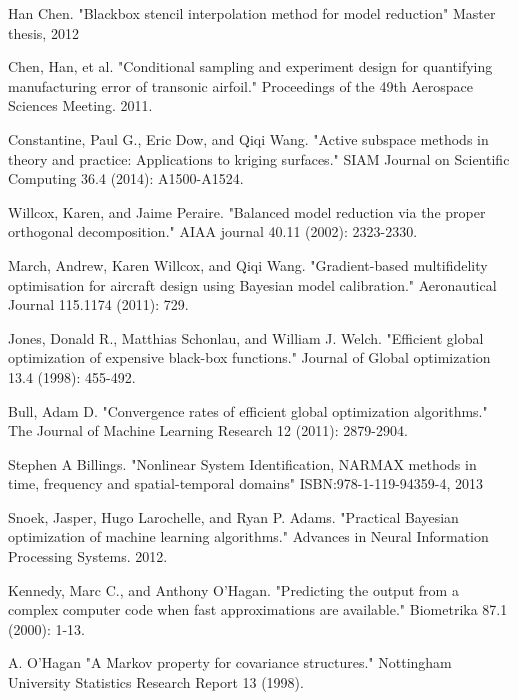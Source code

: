 \documentclass[a4paper,onecolumn]{article}
\theoremstyle{remark}
\begin{document}

\newpage
\begin{thebibliography}{9}
Han Chen.
"Blackbox stencil interpolation method for model reduction"
Master thesis, 2012

Chen, Han, et al. 
"Conditional sampling and experiment design for quantifying manufacturing error of transonic airfoil." 
Proceedings of the 49th Aerospace Sciences Meeting. 2011.

Constantine, Paul G., Eric Dow, and Qiqi Wang. 
"Active subspace methods in theory and practice: Applications to kriging surfaces." 
SIAM Journal on Scientific Computing 36.4 (2014): A1500-A1524.

Willcox, Karen, and Jaime Peraire. 
"Balanced model reduction via the proper orthogonal decomposition." 
AIAA journal 40.11 (2002): 2323-2330.

March, Andrew, Karen Willcox, and Qiqi Wang. 
"Gradient-based multifidelity optimisation for aircraft design using Bayesian model calibration." 
Aeronautical Journal 115.1174 (2011): 729.

Jones, Donald R., Matthias Schonlau, and William J. Welch. 
"Efficient global optimization of expensive black-box functions." 
Journal of Global optimization 13.4 (1998): 455-492.

Bull, Adam D. 
"Convergence rates of efficient global optimization algorithms." 
The Journal of Machine Learning Research 12 (2011): 2879-2904.

Stephen A Billings.
"Nonlinear System Identification, NARMAX methods in time, frequency and spatial-temporal domains"
ISBN:978-1-119-94359-4, 2013

Snoek, Jasper, Hugo Larochelle, and Ryan P. Adams. 
"Practical Bayesian optimization of machine learning algorithms." 
Advances in Neural Information Processing Systems. 2012.

Kennedy, Marc C., and Anthony O'Hagan. 
"Predicting the output from a complex computer code when fast approximations are available." 
Biometrika 87.1 (2000): 1-13.

A. O'Hagan 
"A Markov property for covariance structures." 
Nottingham University Statistics Research Report 13 (1998).


\end{thebibliography}
\end{document}
